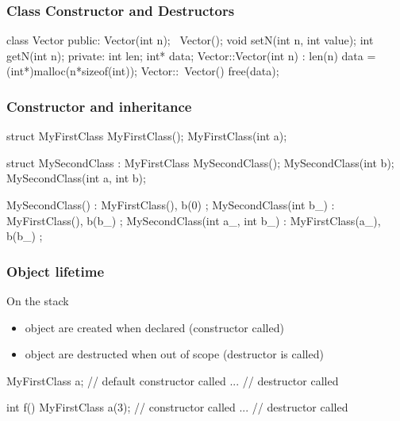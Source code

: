 \begin{frame}[fragile]
  \frametitle{Class Constructor and Destructors}
  \begin{cppcode}
    class Vector {
    public:
      Vector(int n);
      ~Vector();
      void setN(int n, int value);
      int getN(int n);
    private:
      int len;
      int* data;
    }
    Vector::Vector(int n) : len(n) {
      data = (int*)malloc(n*sizeof(int));
    }
    Vector::~Vector() {
      free(data);
    }
  \end{cppcode}
\end{frame}


\begin{frame}[fragile]
  \frametitle{Constructor and inheritance}
  \begin{cppcode}
    struct MyFirstClass {
      MyFirstClass();
      MyFirstClass(int a);
    }

    struct MySecondClass : MyFirstClass {
      MySecondClass();
      MySecondClass(int b);
      MySecondClass(int a, int b);
    }

    MySecondClass() : MyFirstClass(), b(0) {};
    MySecondClass(int b_) : MyFirstClass(), b(b_) {};
    MySecondClass(int a_,
                  int b_) : MyFirstClass(a_), b(b_) {};
  \end{cppcode}
\end{frame}

\begin{frame}[fragile]
  \frametitle{Object lifetime}
  \begin{block}{On the stack}
    \begin{itemize}
    \item object are created when declared (constructor called)
    \item object are destructed when out of scope (destructor is called)
    \end{itemize}
  \end{block}
  \begin{cppcode}
    {
      MyFirstClass a; // default constructor called
      ...
    }  // destructor called

    int f() {
      MyFirstClass a(3); // constructor called
      ...
    } // destructor called
  \end{cppcode}
\end{frame}

